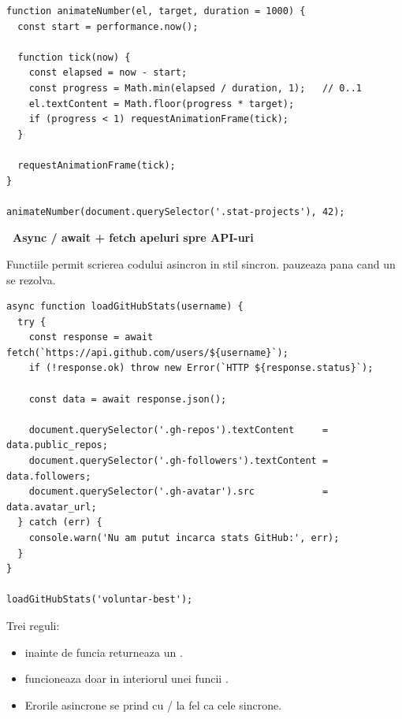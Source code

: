 \begin{bonusbox}
\begin{lstlisting}[style=js, caption={Counter animat de la 0 la o valoare \textcommabelow{t}int\u a}]
function animateNumber(el, target, duration = 1000) {
  const start = performance.now();

  function tick(now) {
    const elapsed = now - start;
    const progress = Math.min(elapsed / duration, 1);   // 0..1
    el.textContent = Math.floor(progress * target);
    if (progress < 1) requestAnimationFrame(tick);
  }

  requestAnimationFrame(tick);
}

animateNumber(document.querySelector('.stat-projects'), 42);
\end{lstlisting}

\medskip

\textbf{\faGlobe\ Async / await + fetch \textendash{} apeluri spre API-uri}

Functiile  permit scrierea codului asincron in stil sincron.  pauzeaza pana cand un  se rezolva.

\begin{lstlisting}[style=js, caption={Voluntar afi\textcommabelow{s}eaz\u a stats GitHub live pe portofoliu}]
async function loadGitHubStats(username) {
  try {
    const response = await fetch(`https://api.github.com/users/${username}`);
    if (!response.ok) throw new Error(`HTTP ${response.status}`);

    const data = await response.json();

    document.querySelector('.gh-repos').textContent     = data.public_repos;
    document.querySelector('.gh-followers').textContent = data.followers;
    document.querySelector('.gh-avatar').src            = data.avatar_url;
  } catch (err) {
    console.warn('Nu am putut incarca stats GitHub:', err);
  }
}

loadGitHubStats('voluntar-best');
\end{lstlisting}

Trei reguli:
\begin{itemize}[itemsep=1pt]
  \item {} inainte de  \textendash{} funcia returneaza un .
  \item {} funcioneaza doar in interiorul unei funcii .
  \item Erorile asincrone se prind cu / la fel ca cele sincrone.
\end{itemize}


\end{bonusbox}
